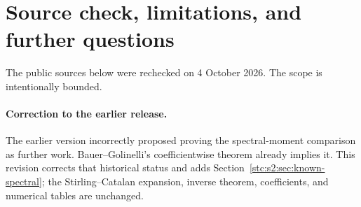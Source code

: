 \documentclass[11pt,letterpaper]{article}
\numberwithin{equation}{section}
\theoremstyle{remark}\newtheorem{remark}[theorem]{Remark}
\begin{document}
\section{Source check, limitations, and further questions}\label{stc:s2:sec:sources}
The public sources below were rechecked on 4 October 2026. The scope is intentionally bounded.

\paragraph{Correction to the earlier release.}
The earlier version incorrectly proposed proving the spectral-moment comparison as further work. Bauer--Golinelli's coefficientwise theorem already implies it. This revision corrects that historical status and adds Section~\ref{stc:s2:sec:known-spectral}; the Stirling--Catalan expansion, inverse theorem, coefficients, and numerical tables are unchanged.
\end{document}
